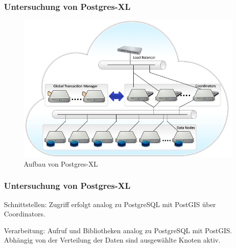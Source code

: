 \documentclass{beamer}
\begin{document}
%
\begin{frame}\frametitle{Untersuchung von Postgres-XL}

\begin{figure}
\centering
\includegraphics[width=1\hsize]{../Abbildungen/postgresxl-structure.jpg}
\caption{Aufbau von Postgres-XL}
\end{figure}
\end{frame}

\begin{frame}\frametitle{Untersuchung von Postgres-XL}
\begin{block}{Schnittstellen:}
Zugriff erfolgt analog zu PostgreSQL mit PostGIS über Coordinators.
\end{block}

\vspace{\baselineskip}
\vspace{\baselineskip}

\begin{block}{Verarbeitung:}
Aufruf und Bibliotheken analog zu PostgreSQL mit PostGIS.\\
Abhängig von der Verteilung der Daten sind ausgewählte Knoten aktiv.
\end{block}

\end{frame}
\end{document}

